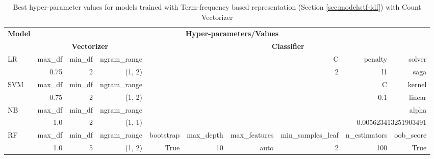 \begin{landscape}
\vspace*{\fill}
\begin{table}[htbp]
    \centering
    \begin{tabular}{|l|rrr|rrrrrr|}
    \hline
    \multirow{2}{*}{\textbf{Model}} & \multicolumn{9}{c|}{\textbf{Hyper-parameters/Values}} \\
    \cline{2-10}
    & \multicolumn{3}{c|}{\textbf{Vectorizer}} & \multicolumn{6}{c|}{\textbf{Classifier}} \\
    \hline
    \multirow{2}{*}{LR} & max\_df & min\_df & ngram\_range  &  &  &  & C & penalty & solver  \\
                        & 0.75    & 2       & (1, 2)        &  &  &  & 2 & l1      & saga  \\
    \hline
    \multirow{2}{*}{SVM} & max\_df  & min\_df & ngram\_range &  &  &  &  & C   & kernel  \\
                         & 0.75     & 2       & (1, 2)       &  &  &  &  & 0.1 & linear  \\
    \hline
    \multirow{2}{*}{NB}  & max\_df  & min\_df & ngram\_range &  &  &  &  \multicolumn{3}{r|}{alpha}  \\
                         & 1.0      & 2        & (1, 1)      &  &  &  &  \multicolumn{3}{r|}{0.005623413251903491} \\
    \hline
    \multirow{2}{*}{RF}  & max\_df & min\_df & ngram\_range & bootstrap & max\_depth & max\_features & min\_samples\_leaf & n\_estimators & oob\_score \\
                         & 1.0     & 5       & (1, 2)       & True      & 10         & auto          & 2                  & 100           & True \\
    \hline
    \end{tabular}
    \caption{Best hyper-parameter values for models trained with Term-frequency based representation (Section \ref{sec:models:tf-idf}) with Count Vectorizer}
    \label{tab:best-hparams-tf-based-count-vect}
\end{table}


\end{landscape}
